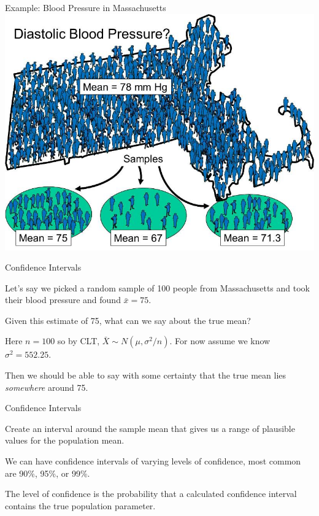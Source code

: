 \documentclass{./../div_teaching_slides}
\begin{document}
\begin{frame}{Example: Blood Pressure in Massachusetts}
\centering \vspace{-0.5em}
\includegraphics[scale=0.35]{Sampling3.jpg}
\end{frame}

\begin{frame}{Confidence Intervals}
\begin{witemize}
	\item Let's say we picked a random sample of 100 people from Massachusetts and took their blood pressure and found $\bar{x} = 75$. 
  \item Given this estimate of 75, what can we say about the true mean?
  \item Here $n=100$ so by CLT, $\bar{X} \sim N(\mu, \sigma^2/n) $. For now assume we know $\sigma^2=552.25$.
  \item Then we should be able to say with some certainty that the true mean lies \textit{somewhere} around 75.
\end{witemize}
\end{frame}


\begin{frame}{Confidence Intervals}
\begin{witemize}
  \item Create an interval around the sample mean that gives us a range of plausible values for the population mean.
  \item We can have confidence intervals of varying levels of confidence, most common are 90\%, 95\%, or 99\%.
  \item The level of confidence is the probability that a calculated confidence interval contains the true population parameter. 
  \end{witemize}
\end{frame}
\end{document}
